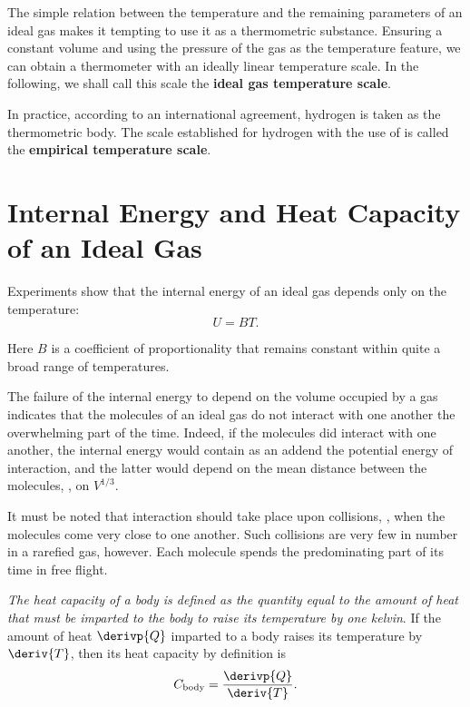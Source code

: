 The simple relation between the temperature and the remaining parameters of an ideal gas makes it tempting to use it as a thermometric substance. Ensuring a constant volume and using the pressure of the gas as the temperature feature, we can obtain a thermometer with an ideally linear temperature scale. In the following, we shall call this scale the \textbf{ideal gas temperature scale}.

In practice, according to an international agreement, hydrogen is taken as the thermometric body. The scale established for hydrogen with the use of  is called the \textbf{empirical temperature scale}.

\section{Internal Energy and Heat Capacity of an Ideal Gas}\label{sec:10_9}

Experiments show that the internal energy of an ideal gas depends only on the temperature:
\begin{equation}\label{eq:10_23}
	U = B T.
\end{equation}

\noindent
Here $B$ is a coefficient of proportionality that remains constant within quite a broad range of temperatures.

The failure of the internal energy to depend on the volume occupied by a gas indicates that the molecules of an ideal gas do not interact with one another the overwhelming part of the time. Indeed, if the molecules did interact with one another, the internal energy would contain as an addend the potential energy of interaction, and the latter would depend on the mean distance between the molecules, \ie, on $V^{1/3}$.

It must be noted that interaction should take place upon collisions, \ie, when the molecules come very close to one another. Such collisions are very few in number in a rarefied gas, however. Each molecule spends the predominating part of its time in free flight.

\textit{The heat capacity of a body is defined as the quantity equal to the amount of heat that must be imparted to the body to raise its temperature by one kelvin}. If the amount of heat $\derivp{Q}$ imparted to a body raises its temperature by $\deriv{T}$, then its heat capacity by definition is
\begin{equation}\label{eq:10_24}
	C_{\text{body}} = \frac{\derivp{Q}}{\deriv{T}}.
\end{equation}

